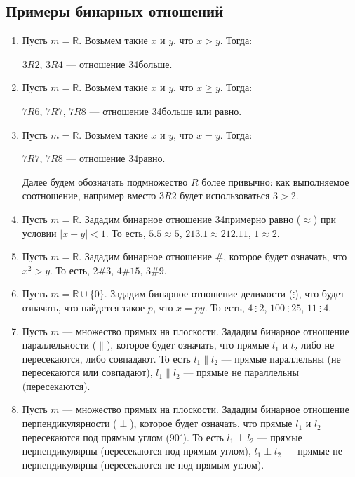 \documentclass[russian]{lecture-notes}
\begin{document}
	\subsection{Примеры бинарных отношений}
	\begin{enumerate}
		\item Пусть $m = \mathbb{R}$. Возьмем такие $x$ и $y$, что $x > y$. Тогда:
		\begin{center}
			$3 R 2$, \sout{$3 R 4$} --- отношение \char34больше\char34.
		\end{center}
		\item Пусть $m = \mathbb{R}$. Возьмем такие $x$ и $y$, что $x \geq y$. Тогда:
		\begin{center}
			$7 R 6$, $7 R 7$, \sout{$7 R 8$} --- отношение больше или равно.
		\end{center}
		\item Пусть $m = \mathbb{R}$. Возьмем такие $x$ и $y$, что $x = y$. Тогда:
		\begin{center}
			$7 R 7$, \sout{$7 R 8$} --- отношение \char34равно\char34.
		\end{center}
		\begin{note}
			Далее будем обозначать подмножество $R$ более привычно: как выполняемое соотношение, например вместо $3 R 2$ будет использоваться $3 > 2$.
		\end{note}
		\item Пусть $m = \mathbb{R}$. Зададим бинарное отношение примерно равно ($\approx$) при условии $|x-y|<1$. То есть, $5.5 \approx 5$, $213.1 \approx 212.11$, \sout{$1 \approx 2$}.
		\item Пусть $m = \mathbb{R}$. Зададим бинарное отношение \char34\#, которое будет означать, что $x^2 > y$. То есть, $2 \# 3$, $4 \# 15$, \sout{$3 \# 9$}.
		\item Пусть $m = \mathbb{R} \cup \{0\}$. Зададим бинарное отношение делимости ($\vdots$), что будет означать, что найдется такое $p$, что $x = py$. То есть, $4~\vdots~2$, $100~\vdots~25$, \sout{$11~\vdots~4$}.
		\item Пусть $m$ --- множество прямых на плоскости. Зададим бинарное отношение параллельности ($\parallel$), которое будет означать, что прямые $l_1$ и $l_2$ либо не пересекаются, либо совпадают. То есть $l_1 \parallel l_2$ --- прямые параллельны (не пересекаются или совпадают), \sout{$l_1 \parallel l_2$} --- прямые не параллельны (пересекаются).
		\item Пусть $m$ --- множество прямых на плоскости. Зададим бинарное отношение перпендикулярности ($\perp$), которое будет означать, что прямые $l_1$ и $l_2$ пересекаются под прямым углом ($90^{\circ}$). То есть $l_1 \perp l_2$ --- прямые перпендикулярны (пересекаются под прямым углом), \sout{$l_1 \perp l_2$} --- прямые не перпендикулярны (пересекаются не под прямым углом).

\end{enumerate}
\end{document}
